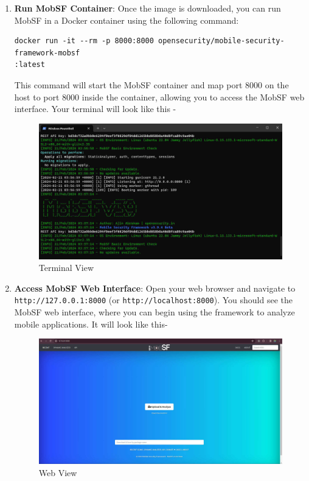 \documentclass{report}
\begin{document}
\begin{enumerate}
    
    \item \textbf{Run MobSF Container}: Once the image is downloaded, you can run MobSF in a Docker container using the following command:
    \begin{mdframed}[backgroundcolor=lightgray]
    \begin{BVerbatim}
docker run -it --rm -p 8000:8000 opensecurity/mobile-security-framework-mobsf
:latest
    \end{BVerbatim}
    \end{mdframed}
    This command will start the MobSF container and map port 8000 on the host to port 8000 inside the container, allowing you to access the MobSF web interface. Your terminal will look like this -
    \begin{figure}[hbt!]
        \centering
        \includegraphics[width=1\textwidth]{images/terminal.jpg}
        \caption{Terminal View}
        \label{fig:example}
    \end{figure}
    \FloatBarrier 
    \item \textbf{Access MobSF Web Interface}: Open your web browser and navigate to \texttt{http://127.0.0.1:8000} (or \texttt{http://localhost:8000}). You should see the MobSF web interface, where you can begin using the framework to analyze mobile applications. It will look like this-
    \begin{figure}[hbt!]
        \centering
        \includegraphics[width=1\textwidth]{images/mobsfwebview.jpg}
        \caption{Web View}
        \label{fig:example}
    \end{figure}
    \FloatBarrier 
    

\end{enumerate}
\end{document}
